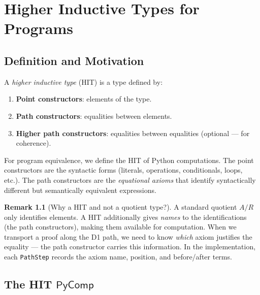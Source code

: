 \documentclass[11pt,a4paper]{report}
\theoremstyle{definition}
\newtheorem{remark}[definition]{Remark}
\theoremstyle{plain}
\begin{document}
\chapter{Higher Inductive Types for Programs}
\label{ch:hits}

\section{Definition and Motivation}

A \emph{higher inductive type} (HIT) is a type defined by:
\begin{enumerate}
  \item \textbf{Point constructors}: elements of the type.
  \item \textbf{Path constructors}: equalities between elements.
  \item \textbf{Higher path constructors}: equalities between
    equalities (optional --- for coherence).
\end{enumerate}

For program equivalence, we define the HIT of Python computations.
The point constructors are the syntactic forms (literals, operations,
conditionals, loops, etc.).  The path constructors are the
\emph{equational axioms} that identify syntactically different but
semantically equivalent expressions.

\begin{remark}[Why a HIT and not a quotient type?]
A standard quotient $A / R$ only identifies elements.  A HIT additionally
gives \emph{names} to the identifications (the path constructors), making
them available for computation.  When we transport a proof along the D1
path, we need to know \emph{which} axiom justifies the equality --- the
path constructor carries this information.  In the implementation,
each \texttt{PathStep} records the axiom name, position, and before/after
terms.
\end{remark}

\section{The HIT $\mathsf{PyComp}$}
\end{document}
